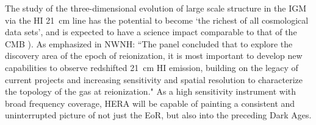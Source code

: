 \documentclass[preprint]{aastex}
\def\HI{{H{\small I }}}
\begin{document}
%
The study of the three-dimensional
evolution of large scale structure in the IGM via the \HI 21~cm line has the
potential to become `the richest of all cosmological data sets', and is expected
to have a science impact comparable to that of the CMB
\citep{barkana_loeb2005a,loeb_zaldarriaga2004}).  As emphasized in
NWNH: ``The panel concluded that to explore the discovery
area of the epoch of reionization, it is most important to develop new
capabilities to observe redshifted 21~cm \HI emission, building on the legacy of
current projects and increasing sensitivity and spatial resolution to
characterize the topology of the gas at reionization."  
As a high
sensitivity instrument with broad frequency coverage, HERA will be capable of
painting a consistent and uninterrupted picture of not just the EoR, but also
into the preceding Dark Ages.  
\end{document}
